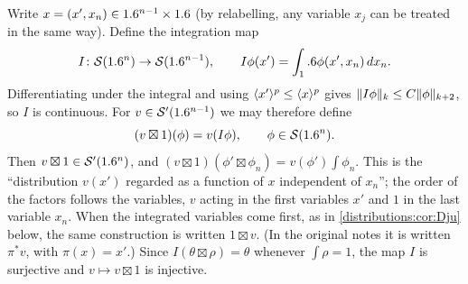 Write $x=(x',x_n)\in1.6^{n-1}\times1.6$ (by relabelling, any variable $x_j$ can be
treated in the same way). Define the integration map
\begin{equation}\label{distributions:eq:fibre-int}
  I\colon\mathcal{S}(1.6^n)\to\mathcal{S}(1.6^{n-1}),\qquad I\phi(x')=\int_1.6\phi(x',x_n)\,dx_n.
\end{equation}
Differentiating under the integral and using $\langle x'\rangle^p\le\langle x\rangle^p$ gives
$\lVert I\phi\rVert_k\le C\lVert \phi\rVert_{k+2}$, so $I$ is continuous. For
$v\in\mathcal{S}'(1.6^{n-1})$ we may therefore define
\begin{equation}\label{distributions:eq:one-tensor}
  (v\boxtimes1)(\phi)=v(I\phi),\qquad\phi\in\mathcal{S}(1.6^n).
\end{equation}
Then $v\boxtimes1\in\mathcal{S}'(1.6^n)$, and
$(v\boxtimes1)(\phi'\boxtimes\phi_n)=v(\phi')\int\phi_n$. This is the
``distribution $v(x')$ regarded as a function of $x$ independent of $x_n$''; the order of the factors
follows the variables, $v$ acting in the first variables $x'$ and $1$ in the last
variable $x_n$. When the integrated variables come first, as in
\cref{distributions:cor:Dju} below, the same construction is written $1\boxtimes v$. (In the
original notes it is written $\pi^*v$, with $\pi(x)=x'$.) Since
$I(\theta\boxtimes\rho)=\theta$ whenever $\int\rho=1$, the map $I$ is surjective and
$v\mapsto v\boxtimes1$ is injective.

